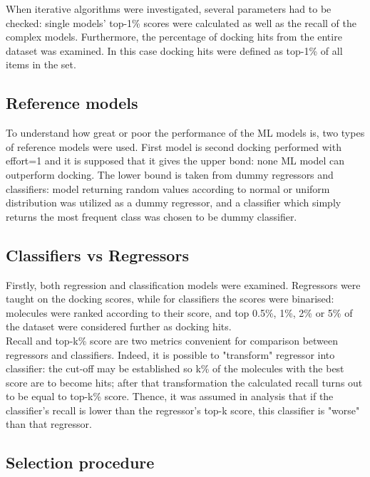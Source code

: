 When iterative algorithms were investigated, several parameters had to be checked: 
single models' top-1\% scores were calculated as well as the recall of the complex 
models.
Furthermore, the percentage of docking hits from the entire dataset was examined.
In this case docking hits were defined as top-1\% of all items in the set.\\

\subsection{Reference models}
To understand how great or poor the performance of the ML models is, two types of 
reference models were used.
First model is second docking performed with effort=1 and it is supposed that it 
gives the upper bond: none ML model can outperform docking.
The lower bound is taken from dummy regressors and classifiers: model returning 
random values according to normal or uniform distribution was utilized as a dummy 
regressor, and a classifier which simply returns the most frequent class was chosen 
to be dummy classifier.\\

\subsection{Classifiers vs Regressors}

Firstly, both regression and classification models were examined.
Regressors were taught on the docking scores, while for classifiers the scores were 
binarised: molecules were ranked according to their score, and top 0.5\%, 1\%, 2\% 
or 5\% of the dataset were considered further as docking hits.\\

Recall and top-k\% score are two metrics convenient for comparison between regressors 
and classifiers.
Indeed, it is possible to "transform" regressor into classifier: the cut-off may 
be established so k\% of the molecules with the best score are to become hits; after 
that transformation the calculated recall turns out to be equal to top-k\% score.
Thence, it was assumed in analysis that if the classifier's recall is lower than 
the regressor's top-k score, this classifier is "worse" than that regressor.\\

\subsection{Selection procedure}

